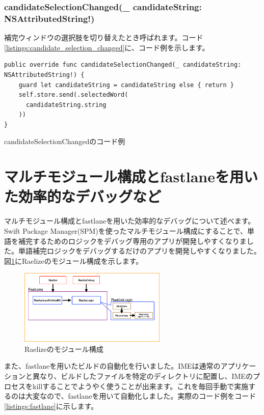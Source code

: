 \documentclass[uplatex,a4j,12pt,twocolumn]{jsarticle}
\begin{document}
\subsubsection{candidateSelectionChanged(\_ candidateString: NSAttributedString!)}
補完ウィンドウの選択肢を切り替えたとき呼ばれます。コード\ref{listings:candidate_selection_changed}に、コード例を示します。
\begin{listing}[h]
  \begin{verbatim}
public override func candidateSelectionChanged(_ candidateString: NSAttributedString!) {
    guard let candidateString = candidateString else { return }
    self.store.send(.selectedWord(
      candidateString.string
    ))
}
  \end{verbatim}
  \caption{candidateSelectionChangedのコード例}\label{listings:candidate_selection_changed}
\end{listing}

\section{マルチモジュール構成とfastlaneを用いた効率的なデバッグなど}\label{sec:multi_module_and_fastlane}
マルチモジュール構成とfastlaneを用いた効率的なデバッグについて述べます。Swift Package Manager(SPM)を使ったマルチモジュール構成にすることで、単語を補完するためのロジックをデバッグ専用のアプリが開発しやすくなりました。単語補完ロジックをデバッグするだけのアプリを開発しやすくなりました。図\ref{fig:raelize_architecture}にRaelizeのモジュール構成を示します。

\begin{figure}[h]
  \begin{center}
      \includegraphics[width=7cm]{image/architecture.png}
      \caption{Raelizeのモジュール構成}
      \label{fig:raelize_architecture}
  \end{center}
\end{figure}

また、fastlaneを用いたビルドの自動化を行いました。IMEは通常のアプリケーションと異なり、ビルドしたファイルを特定のディレクトリに配置し、IMEのプロセスをkillすることでようやく使うことが出来ます\cite{bib:input_method_kit_tips}。これを毎回手動で実施するのは大変なので、fastlaneを用いて自動化しました。実際のコード例をコード\ref{listings:fastlane}に示します。
\end{document}
